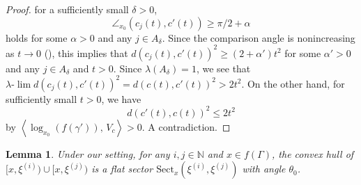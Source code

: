 \documentclass[12pt]{amsart}
\numberwithin{equation}{section}
\theoremstyle{plain}
\newtheorem{Lemma}[Theorem]{Lemma}
\theoremstyle{definition}
\theoremstyle{remark}
\newcommand{\N}{{\mathbb N}}
\newcommand{\tcprj}{\log}
\newcommand{\inner}[2]{\left\langle #1,\, #2 \right\rangle}
\newcommand{\ulim}{\lambda{\text{-}}\!\lim}
\newcommand{\xxi}[1]{\xi^{(#1)}}
\newcommand{\ray}[1]{[#1)}
\newcommand{\sect}[3][]{\mathrm{Sect}_{#1}(#2,#3)}
\newcommand{\zure}{\theta_0}
\begin{document}
\begin{proof}
 for a sufficiently small $\delta>0$, 
 \begin{equation*}
 \angle_{x_0}(c_j(t), c'(t)) \geq \pi/2 + \alpha
 \end{equation*}
 holds for some $\alpha>0$ and any $j \in A_{\delta}$.  
 Since the comparison angle is nonincreasing as $t\to 0$
 (\cite[p.~184, 3.1 Proposition]{bridson-haefliger}), 
 this implies that 
 $d(c_j(t),c'(t))^2 \geq (2+\alpha')t^2$ for some $\alpha'>0$ and 
 any $j \in A_{\delta}$ and $t>0$.  
 Since $\lambda(A_{\delta})=1$, we see that 
 $\ulim d(c_j(t),c'(t))^2 = d(c(t),c'(t))^2> 2t^2$. 
 On the other hand, for sufficiently small $t>0$, we have
 \begin{equation*}
 d(c'(t),c(t))^2 \leq 2t^2
 \end{equation*}
 by $\inner{\tcprj_{x_0}(f(\gamma'))}{V_c} >0$. 
 A contradiction. 
\end{proof}

%
% 
\begin{Lemma}
 \label{lem:if_angle_is_positive}
 Under our setting, for any $i,j \in \N$ and  $x \in f(\Gamma)$, 
 the convex hull of $\ray{x,\xxi{i}}\cup \ray{x,\xxi{j}}$ is a flat
 sector $\sect[x]{\xxi{i}}{\xxi{j}}$ with angle $\zure$. 
\end{Lemma}
\end{document}
